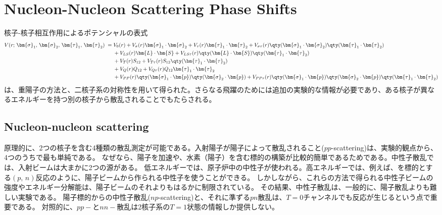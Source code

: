 \documentclass[a4paper,11pt,uplatex]{jsarticle}
\begin{document}
\newpage
\section{Nucleon-Nucleon Scattering Phase Shifts}
核子-核子相互作用によるポテンシャルの表式
\begin{align}
  V(r;\,\bm{\sigma}_1,\,\bm{\sigma}_2,\,\bm{\tau}_1,\,\bm{\tau}_2) \;=\; &
  V_0(r)+V_\sigma(r)\bm{\sigma}_1\cdot\bm{\sigma}_2 + V_\tau(r)\bm{\tau}_1\cdot\bm{\tau}_2
  + V_{\sigma\tau}(r)\qty(\bm{\sigma}_1\cdot\bm{\sigma}_2)\qty(\bm{\tau}_1\cdot\bm{\tau}_2) \notag                                                    \\
                                                                         & +V_{LS}(r)\bm{L}\cdot\bm{S} +
  V_{LS\tau}(r)\qty(\bm{L}\cdot\bm{S})\qty(\bm{\tau}_1\cdot\bm{\tau}_2) \notag                                                                        \\
                                                                         & +V_{T}(r)S_{12}+V_{T\tau}(r)S_{12}\qty(\bm{\tau}_1\cdot\bm{\tau}_2) \notag \\
                                                                         & +V_Q(r)Q_{12}+V_{Q\tau}(r)Q_{12}\bm{\tau}_1\cdot\bm{\tau}_2 \notag         \\
                                                                         & + V_{PP}(r)\qty(\bm{\sigma}_1\cdot\bm{p})\qty(\bm{\sigma}_2\cdot\bm{p})
  +V_{PP\tau}(r)\qty(\bm{\sigma}_1\cdot\bm{p})\qty(\bm{\sigma}_2\cdot\bm{p})\qty(\bm{\tau}_1\cdot\bm{\tau}_2)
\end{align}
は、重陽子の方法と、二核子系の対称性を用いて得られた。さらなる飛躍のためには追加の実験的な情報が必要であり、ある核子が異なるエネルギーを持つ別の核子から散乱されることでもたらされる。

\subsection*{Nucleon-nucleon scattering}
原理的に、2つの核子を含む4種類の散乱測定が可能である。入射陽子が陽子によって散乱されること($pp$-scattering)は、実験的観点から、4つのうちで最も単純である。
なぜなら、陽子を加速や、水素（陽子）を含む標的の構築が比較的簡単であるためである。中性子散乱では、入射ビームは大まかに2つの源がある。
低エネルギーでは、原子炉中の中性子が使われる。高エネルギーでは、例えば、を標的とする$(p,\,n)$反応のように、陽子ビームから作られる中性子を使うことができる。
しかしながら、これらの方法で得られる中性子ビームの強度やエネルギー分解能は、陽子ビームのそれよりもはるかに制限されている。
その結果、中性子散乱は、一般的に、陽子散乱よりも難しい実験である。
陽子標的からの中性子散乱($np$-scattering)と、それに準ずる$pn$散乱は、$T=0$チャンネルでも反応が生じるという点で重要である。
対照的に、$pp-$と$nn-$散乱は2核子系の$T=1$状態の情報しか提供しない。
\end{document}
